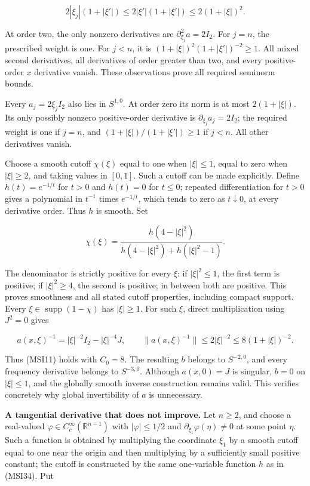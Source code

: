 \documentclass[
  11pt,
]{article}
\begin{document}
\[
2|\xi_j|(1+|\xi'|)
\leq2|\xi'|(1+|\xi'|)
\leq2(1+|\xi|)^2.
\tag{MSI33}
\]

At order two, the only nonzero derivatives are
\(\partial_{\xi_j}^2a=2I_2\). For \(j=n\), the prescribed weight is one.
For \(j<n\), it is \((1+|\xi|)^2(1+|\xi'|)^{-2}\geq1\). All mixed second
derivatives, all derivatives of order greater than two, and every
positive-order \(x\) derivative vanish. These observations prove all
required seminorm bounds.

Every \(a_j=2\xi_jI_2\) also lies in \(S^{1,0}\). At order zero its norm
is at most \(2(1+|\xi|)\). Its only possibly nonzero positive-order
derivative is \(\partial_{\xi_j}a_j=2I_2\); the required weight is one
if \(j=n\), and \((1+|\xi|)/(1+|\xi'|)\geq1\) if \(j<n\). All other
derivatives vanish.

Choose a smooth cutoff \(\chi(\xi)\) equal to one when \(|\xi|\leq1\),
equal to zero when \(|\xi|\geq2\), and taking values in \([0,1]\). Such
a cutoff can be made explicitly. Define \(h(t)=e^{-1/t}\) for \(t>0\)
and \(h(t)=0\) for \(t\leq0\); repeated differentiation for \(t>0\)
gives a polynomial in \(t^{-1}\) times \(e^{-1/t}\), which tends to zero
as \(t\downarrow0\), at every derivative order. Thus \(h\) is smooth.
Set

\[
\chi(\xi)
=\frac{h(4-|\xi|^2)}
       {h(4-|\xi|^2)+h(|\xi|^2-1)}.
\tag{MSI34}
\]

The denominator is strictly positive for every \(\xi\): if
\(|\xi|^2\leq1\), the first term is positive; if \(|\xi|^2\geq4\), the
second is positive; in between both are positive. This proves smoothness
and all stated cutoff properties, including compact support. Every
\(\xi\in\operatorname{supp}(1-\chi)\) has \(|\xi|\geq1\). For such
\(\xi\), direct multiplication using \(J^2=0\) gives

\[
a(x,\xi)^{-1}=|\xi|^{-2}I_2-|\xi|^{-4}J,
\qquad
\|a(x,\xi)^{-1}\|
\leq2|\xi|^{-2}\leq8(1+|\xi|)^{-2}.
\tag{MSI35}
\]

Thus (MSI11) holds with \(C_0=8\). The resulting \(b\) belongs to
\(S^{-2,0}\), and every frequency derivative belongs to \(S^{-3,0}\).
Although \(a(x,0)=J\) is singular, \(b=0\) on \(|\xi|\leq1\), and the
globally smooth inverse construction remains valid. This verifies
concretely why global invertibility of \(a\) is unnecessary.

\textbf{A tangential derivative that does not improve.} Let \(n\geq2\),
and choose a real-valued \(\varphi\in C_c^\infty(\mathbb R^{n-1})\) with
\(|\varphi|\leq1/2\) and \(\partial_{\xi_1}\varphi(\eta)\ne0\) at some
point \(\eta\). Such a function is obtained by multiplying the
coordinate \(\xi_1\) by a smooth cutoff equal to one near the origin and
then multiplying by a sufficiently small positive constant; the cutoff
is constructed by the same one-variable function \(h\) as in (MSI34).
Put
\end{document}
